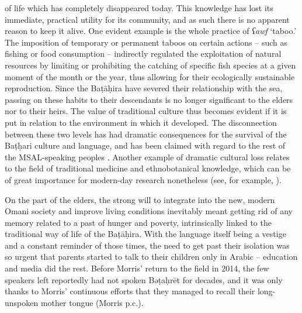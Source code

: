 \documentclass[output=paper]{langscibook}
\begin{document}
of life which has completely disappeared today. This knowledge has lost its immediate, practical utility for its community, and as such there is no apparent reason to keep it alive. One evident example is the whole practice of \textit{ʕawf} ‘taboo.’ The imposition of temporary or permanent taboos on certain actions – such as fishing or food consumption – indirectly regulated the exploitation of natural resources by limiting or prohibiting the catching of specific fish species at a given moment of the month or the year, thus allowing for their ecologically sustainable reproduction. Since the Baṭāḥira have severed their relationship with the sea, passing on these habits to their descendants is no longer significant to the elders nor to their heirs. The value of traditional culture thus becomes evident if it is put in relation to the environment in which it developed. The disconnection between these two levels has had dramatic consequences for the survival of the Baṭḥari culture and language, and has been claimed with regard to the rest of the MSAL-speaking peoples \citep{watson_language_2017}. Another example of dramatic cultural loss relates to the field of traditional medicine and ethnobotanical knowledge, which can be of great importance for modern-day research nonetheless (see, for example, \cite{leonti_traditional_2013}).

On the part of the elders, the strong will to integrate into the new, modern Omani society and improve living conditions inevitably meant getting rid of any memory related to a past of hunger and poverty, intrinsically linked to the traditional way of life of the Baṭāḥira. With the language itself being a vestige and a constant reminder of those times, the need to get past their isolation was so urgent that parents started to talk to their children only in Arabic – education and media did the rest. Before Morris’ return to the field in 2014, the few speakers left reportedly had not spoken Bəṭaḥrēt for decades, and it was only thanks to Morris’ continuous efforts that they managed to recall their long-unspoken mother tongue (Morris p.c.).
\end{document}
